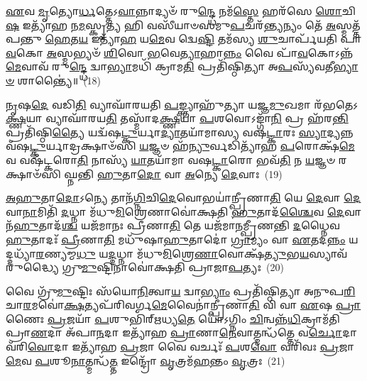 \-\ul{𑌏}\-𑌵 \ul{𑌮𑍃}\-𑌤𑍍𑌯𑍋\-\ul{𑌰𑍍𑌧}\-𑌤𑍍𑌤𑍇\-𑌽\-\ul{𑌵𑌾}\-𑌨𑍍𑌨𑌾𑌦𑍍𑌯𑍞᳴ 𑌰𑍁\-\ul{𑌨𑍍𑌦𑍍𑌧𑍇} 𑌨𑌮᳴\-\ul{𑌸𑍍𑌤𑍇} 𑌹𑌰᳴𑌸𑍇 \ul{𑌶𑍋}\-𑌚𑌿\-\ul{𑌷} 𑌇𑌤𑍍𑌯𑌾᳴𑌹 𑌨\-\ul{𑌮}\-𑌸𑍍𑌕𑍃\-\ul{𑌤𑍍𑌯} 𑌹𑌿 𑌵𑌸𑍀᳴𑌯𑌾𑍞𑌸𑌮𑍁\-\ul{𑌪}\-𑌚𑌰᳴\-\ul{𑌨𑍍𑌤𑍍𑌯}\-𑌨𑍍𑌯𑌂 𑌤𑍇᳴ \ul{𑌅}\-𑌸𑍍𑌮𑌤𑍍𑌤᳴𑌪𑌨𑍍𑌤𑍁 \ul{𑌹𑍇}\-𑌤\-\ul{𑌯} 𑌇𑌤𑍍𑌯𑌾᳴\-\ul{𑌹} 𑌯\-\ul{𑌮𑍇}\-𑌵 𑌦𑍍𑌵𑍇\-\ul{𑌷𑍍𑌟𑌿} 𑌤𑌮᳴𑌸𑍍𑌯 \ul{𑌶𑍁}\-𑌚𑌾𑌰𑍍𑌪᳴𑌯𑌤𑌿 𑌪𑌾\-\ul{𑌵}\-𑌕𑍋 \ul{𑌅}\-𑌸𑍍𑌮𑌭𑍍𑌯𑍞᳴ \ul{𑌶𑌿}\-𑌵𑍋 \ul{𑌭}\-𑌵𑍇\-\ul{𑌤𑍍𑌯𑌾}\-𑌹𑌾\-\ul{𑌨𑍍𑌨𑌂} 𑌵𑍈 𑌪𑌾᳴\-\ul{𑌵}\-𑌕𑍋\-𑌽𑌨𑍍𑌨᳴\-\ul{𑌮𑍇}\-𑌵𑌾𑌵᳴ 𑌰𑍁\-\ul{𑌨𑍍𑌦𑍍𑌧𑍇} 𑌦𑍍𑌵𑌾\-\ul{𑌭𑍍𑌯𑌾}\-𑌮𑌧𑌿᳴ 𑌕𑍍𑌰𑌾𑌮\-\ul{𑌤𑌿} 𑌪𑍍𑌰𑌤𑌿᳴𑌷𑍍𑌠𑌿𑌤𑍍𑌯𑌾 𑌅\-\ul{𑌪}\-𑌸𑍍𑌯᳴𑌵𑌤𑍀\-\ul{𑌭𑍍𑌯𑌾}\-\-\ul{𑍞} 𑌶𑌾𑌨𑍍𑌤𑍍𑌯𑍈॑॥~(18)

{\anuvakamend[{𑌶𑍁𑌗𑍍𑌵𑍇᳴\-\ul{𑌤}\-𑌸𑍋᳴\-𑌽𑌪𑌾𑌮᳴\-\ul{𑌷𑍍𑌟𑌾}\-𑌭𑌿𑌰𑍍𑌵𑌿𑌕᳴𑌰𑍍\mbox{}𑌷\-\ul{𑌤𑌿} 𑌨𑌾𑌨𑍍𑌤𑌰𑍇\-\ul{𑌕𑌾}\-𑌨𑍍𑌨𑌪᳴\-\ul{𑌞𑍍𑌚𑌾}\-𑌶𑌚𑍍𑌚᳴}]}%

\-\ul{𑌨𑍃}\-𑌷\-\ul{𑌦𑍇} 𑌵𑌡𑌿\-\ul{𑌤𑌿} 𑌵𑍍𑌯𑌾𑌘𑌾᳴𑌰𑌯𑌤𑌿 \ul{𑌪}\-𑌙𑍍𑌕𑍍𑌤𑍍𑌯𑌾𑌹𑍁᳴𑌤𑍍𑌯𑌾 𑌯𑌜𑍍𑌞\-\ul{𑌮𑍁}\-𑌖𑌮𑌾 𑌰᳴𑌭𑌤𑍇\-𑌽\-\ul{𑌕𑍍𑌷𑍍𑌣}\-𑌯𑌾 𑌵𑍍𑌯𑌾𑌘𑌾᳴𑌰𑌯\-\ul{𑌤𑌿} 𑌤𑌸𑍍𑌮𑌾᳴𑌦\-\ul{𑌕𑍍𑌷𑍍𑌣}\-𑌯𑌾 \ul{𑌪}\-𑌶𑌵𑍋\-𑌽𑌙𑍍𑌗𑌾᳴\-\ul{𑌨𑌿} 𑌪𑍍𑌰 𑌹᳴𑌰\-\ul{𑌨𑍍𑌤𑌿} 𑌪𑍍𑌰𑌤𑌿᳴𑌷𑍍𑌠𑌿\-\ul{𑌤𑍍𑌯𑍈} 𑌯𑌦𑍍𑌵᳴𑌷\-\ul{𑌟𑍍𑌕𑍁}\-𑌰𑍍𑌯𑌾\-\ul{𑌦𑍍𑌯𑌾}\-𑌤𑌯𑌾᳴𑌮𑌾𑌸𑍍𑌯 𑌵𑌷\-\ul{𑌟𑍍𑌕𑌾}\-𑌰𑌃 \ul{𑌸𑍍𑌯𑌾}\-𑌦𑍍𑌯𑌨𑍍𑌨 𑌵᳴𑌷\-\ul{𑌟𑍍𑌕𑍁}\-॒𑌰𑍍𑌯𑌾𑌦𑍍𑌰𑌕𑍍𑌷𑌾𑍞᳴𑌸𑌿 \ul{𑌯}\-𑌜𑍍𑌞𑍞 𑌹᳴\-\ul{𑌨𑍍𑌯𑍁}\-𑌰𑍍𑌵𑌡𑌿𑌤𑍍𑌯𑌾᳴𑌹 \ul{𑌪}\-𑌰𑍋𑌕𑍍𑌷᳴\-\ul{𑌮𑍇}\-𑌵 𑌵𑌷᳴𑌟𑍍𑌕𑌰𑍋\-\ul{𑌤𑌿} 𑌨𑌾𑌸𑍍𑌯᳴ \ul{𑌯𑌾}\-𑌤𑌯𑌾᳴𑌮𑌾 𑌵𑌷\-\ul{𑌟𑍍𑌕𑌾}\-𑌰𑍋 𑌭𑌵᳴\-\ul{𑌤𑌿} 𑌨 \ul{𑌯}\-𑌜𑍍𑌞𑍞 𑌰𑌕𑍍𑌷𑌾𑍞᳴𑌸𑌿 𑌘𑍍𑌨𑌨𑍍𑌤𑌿 \ul{𑌹𑍁}\-𑌤𑌾\-\ul{𑌦𑍋} 𑌵𑌾 \ul{𑌅}\-𑌨𑍍𑌯𑍇 \ul{𑌦𑍇}\-𑌵𑌾𑌃~(19)

\-\ul{𑌅}\-\-\ul{𑌹𑍁}\-𑌤𑌾\-\ul{𑌦𑍋}\-\-𑌽𑌨𑍍𑌯𑍇 𑌤𑌾𑌨᳴\-\ul{𑌗𑍍𑌨𑌿}\-𑌚𑌿\-\ul{𑌦𑍇}\-𑌵𑍋𑌭𑌯𑌾॑𑌨𑍍𑌪𑍍𑌰𑍀𑌣𑌾\-\ul{𑌤𑌿} 𑌯𑍇 \ul{𑌦𑍇}\-𑌵𑌾 \ul{𑌦𑍇}\-𑌵𑌾\-\ul{𑌨𑌾}\-𑌮𑌿𑌤𑌿᳴ \ul{𑌦}\-𑌧𑍍𑌨𑌾 𑌮᳴𑌧𑍁\-\ul{𑌮𑌿}\-𑌶𑍍𑌰𑍇𑌣𑌾𑌵𑍋॑𑌕𑍍𑌷𑌤𑌿 \ul{𑌹𑍁}\-𑌤𑌾𑌦᳴\-\ul{𑌶𑍍𑌚𑍈}\-𑌵 \ul{𑌦𑍇}\-𑌵𑌾𑌨᳴\-\ul{𑌹𑍁}\-𑌤𑌾𑌦᳴\-\ul{𑌶𑍍𑌚} 𑌯𑌜᳴𑌮𑌾𑌨𑌃 𑌪𑍍𑌰𑍀𑌣𑌾\-\ul{𑌤𑌿} 𑌤𑍇 𑌯𑌜᳴𑌮𑌾𑌨𑌮𑍍𑌪𑍍𑌰𑍀𑌣𑌨𑍍𑌤𑌿 \ul{𑌦}\-𑌧𑍍𑌨𑍈𑌵 \ul{𑌹𑍁}\-𑌤𑌾𑌦𑌃᳴ \ul{𑌪𑍍𑌰𑍀}\-𑌣𑌾\-\ul{𑌤𑌿} 𑌮𑌧𑍁᳴𑌷𑌾\-\ul{𑌹𑍁}\-𑌤𑌾𑌦𑍋॑ \ul{𑌗𑍍𑌰𑌾}\-𑌮𑍍𑌯𑌂 𑌵𑌾 \ul{𑌏}\-𑌤𑌦\-\ul{𑌨𑍍𑌨𑌂} 𑌯𑌦𑍍𑌦𑌧𑍍𑌯𑌾᳴\-\ul{𑌰}\-𑌣𑍍𑌯𑌮𑍍𑌮\-\ul{𑌧𑍁} 𑌯\-\ul{𑌦𑍍𑌦}\-𑌧𑍍𑌨𑌾 𑌮᳴𑌧𑍁\-\ul{𑌮𑌿}\-𑌶𑍍𑌰𑍇\-\ul{𑌣𑌾}\-𑌵𑍋𑌕𑍍𑌷᳴\-\ul{𑌤𑍍𑌯𑍁}\-𑌭\-\ul{𑌯}\-𑌸𑍍𑌯𑌾𑌵᳴𑌰𑍁𑌦𑍍𑌧𑍍𑌯𑍈 𑌗𑍍𑌰𑍁\-\ul{𑌮𑍁}\-𑌷𑍍𑌟𑌿𑌨𑌾𑌵𑍋॑𑌕𑍍𑌷𑌤𑌿 𑌪𑍍𑌰𑌾𑌜𑌾\-\ul{𑌪}\-𑌤𑍍𑌯𑌃~(20)

𑌵𑍈 𑌗𑍍𑌰𑍁᳴\-\ul{𑌮𑍁}\-𑌷𑍍𑌟𑌿𑌃 𑌸᳴𑌯𑍋\-\ul{𑌨𑌿}\-𑌤𑍍𑌵𑌾\-\ul{𑌯} 𑌦𑍍𑌵𑌾\-\ul{𑌭𑍍𑌯𑌾𑌂} 𑌪𑍍𑌰𑌤𑌿᳴𑌷𑍍𑌠𑌿𑌤𑍍𑌯𑌾 𑌅𑌨𑍁𑌪\-\ul{𑌰𑌿}\-𑌚𑌾\-\ul{𑌰}\-𑌮𑌵𑍋॑\-\ul{𑌕𑍍𑌷}\-𑌤𑍍𑌯𑌪᳴𑌰𑌿𑌵𑌰𑍍𑌗\-\ul{𑌮𑍇}\-𑌵𑍈𑌨𑌾॑𑌨𑍍𑌪𑍍𑌰𑍀𑌣𑌾\-\ul{𑌤𑌿} 𑌵𑌿 𑌵𑌾 \ul{𑌏}\-𑌷 \ul{𑌪𑍍𑌰𑌾}\-𑌣𑍈𑌃 \ul{𑌪𑍍𑌰}\-𑌜𑌯𑌾᳴ \ul{𑌪}\-𑌶𑍁𑌭𑌿᳴𑌰𑍍\mbox{}𑌋𑌧𑍍𑌯\-\ul{𑌤𑍇} 𑌯𑍋॑\-𑌽𑌗𑍍𑌨𑌿𑌂 \ul{𑌚𑌿}\-𑌨𑍍𑌵𑌨𑍍𑌨᳴\-\ul{𑌧𑌿}\-𑌕𑍍𑌰𑌾𑌮᳴𑌤𑌿 𑌪𑍍𑌰𑌾\-\ul{𑌣}\-𑌦𑌾 𑌅᳴𑌪𑌾\-\ul{𑌨}\-𑌦𑌾 𑌇𑌤𑍍𑌯𑌾᳴𑌹 \ul{𑌪𑍍𑌰𑌾}\-𑌣𑌾\-\ul{𑌨𑍇}\-𑌵𑌾𑌤𑍍𑌮𑌨𑍍𑌧᳴𑌤𑍍𑌤𑍇 𑌵\-\ul{𑌰𑍍𑌚𑍋}\-𑌦𑌾 𑌵᳴𑌰𑌿\-\ul{𑌵𑍋}\-𑌦𑌾 𑌇𑌤𑍍𑌯𑌾᳴𑌹 \ul{𑌪𑍍𑌰}\-𑌜𑌾 𑌵𑍈 𑌵𑌰𑍍𑌚𑌃᳴ \ul{𑌪}\-𑌶\-\ul{𑌵𑍋} 𑌵𑌰𑌿᳴𑌵𑌃 \ul{𑌪𑍍𑌰}\-𑌜𑌾\-\ul{𑌮𑍇}\-𑌵 \ul{𑌪}\-𑌶𑍂\-\ul{𑌨𑌾}\-𑌤𑍍𑌮𑌨𑍍𑌧᳴\-\ul{𑌤𑍍𑌤} 𑌇𑌨𑍍𑌦𑍍𑌰𑍋᳴ \ul{𑌵𑍃}\-𑌤𑍍𑌰𑌮᳴\-\ul{𑌹}\-𑌨𑍍𑌤𑌂 \ul{𑌵𑍃}\-𑌤𑍍𑌰𑌃~(21)

